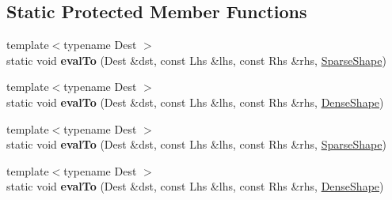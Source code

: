 \subsection*{Static Protected Member Functions}
\begin{DoxyCompactItemize}
\item 
\mbox{\label{struct_eigen_1_1internal_1_1generic__product__impl_3_01_lhs_00_01_rhs_00_01_sparse_shape_00_01_s0f15bf86456099378e4a76f37323e721_a95fc81a20075b0f4d8b2dc2b7a7f4072}} 
{\footnotesize template$<$typename Dest $>$ }\\static void {\bfseries eval\+To} (Dest \&dst, const Lhs \&lhs, const Rhs \&rhs, \hyperlink{struct_eigen_1_1_sparse_shape}{Sparse\+Shape})
\item 
\mbox{\label{struct_eigen_1_1internal_1_1generic__product__impl_3_01_lhs_00_01_rhs_00_01_sparse_shape_00_01_s0f15bf86456099378e4a76f37323e721_a2ac8a7fd6756f40d114adb7815bddc39}} 
{\footnotesize template$<$typename Dest $>$ }\\static void {\bfseries eval\+To} (Dest \&dst, const Lhs \&lhs, const Rhs \&rhs, \hyperlink{struct_eigen_1_1_dense_shape}{Dense\+Shape})
\item 
\mbox{\label{struct_eigen_1_1internal_1_1generic__product__impl_3_01_lhs_00_01_rhs_00_01_sparse_shape_00_01_s0f15bf86456099378e4a76f37323e721_a95fc81a20075b0f4d8b2dc2b7a7f4072}} 
{\footnotesize template$<$typename Dest $>$ }\\static void {\bfseries eval\+To} (Dest \&dst, const Lhs \&lhs, const Rhs \&rhs, \hyperlink{struct_eigen_1_1_sparse_shape}{Sparse\+Shape})
\item 
\mbox{\label{struct_eigen_1_1internal_1_1generic__product__impl_3_01_lhs_00_01_rhs_00_01_sparse_shape_00_01_s0f15bf86456099378e4a76f37323e721_a2ac8a7fd6756f40d114adb7815bddc39}} 
{\footnotesize template$<$typename Dest $>$ }\\static void {\bfseries eval\+To} (Dest \&dst, const Lhs \&lhs, const Rhs \&rhs, \hyperlink{struct_eigen_1_1_dense_shape}{Dense\+Shape})
\end{DoxyCompactItemize}


